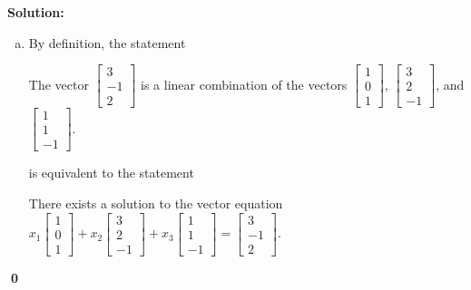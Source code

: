 \documentclass{article}
\newenvironment{solution}
{
  \ignorespaces
  \textbf{Solution:}
}
{
  \ignorespacesafterend
  \begin{flushright}
  {\bfseries \qed}
  \end{flushright}
}
\begin{document}
\begin{solution}
\begin{enumerate}[(a)]
\item By definition, the statement 
\begin{center}\begin{minipage}{0.8\textwidth}
The vector \(\begin{bmatrix} 3 \\ -1 \\ 2 \end{bmatrix} \) is a linear combination of the vectors
\(\begin{bmatrix} 1 \\ 0 \\ 1 \end{bmatrix} \),
\(\begin{bmatrix} 3 \\ 2 \\ -1 \end{bmatrix} \), and
\(\begin{bmatrix} 1 \\ 1 \\ -1 \end{bmatrix} \).
\end{minipage}\end{center}
is equivalent to the statement
\begin{center}\begin{minipage}{0.8\textwidth}
There exists a solution to the vector equation
\(x_1\begin{bmatrix} 1 \\ 0 \\ 1 \end{bmatrix} +
x_2\begin{bmatrix} 3 \\ 2 \\ -1 \end{bmatrix} +
x_3\begin{bmatrix} 1 \\ 1 \\ -1 \end{bmatrix} =
\begin{bmatrix} 3 \\ -1 \\ 2 \end{bmatrix}.\)
\end{minipage}\end{center}


\end{enumerate}
\end{solution}
\end{document}

